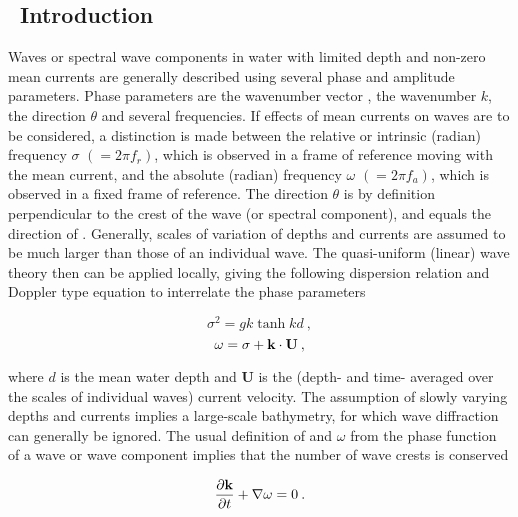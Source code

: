 \vssub
\subsection{~Introduction} \label{sec:intro}
\vssub

Waves or spectral wave components in water with limited depth and non-zero
mean currents are generally described using several phase and amplitude
parameters. Phase parameters are the wavenumber vector {\bk}, the wavenumber
$k$, the direction $\theta$ and several frequencies. If effects of mean
currents on waves are to be considered, a distinction is made between the
relative or intrinsic (radian) frequency $\sigma$ $(= 2 \pi f_r)$, which is
observed in a frame of reference moving with the mean current, and the
absolute (radian) frequency $\omega$ $(= 2 \pi f_a)$, which is observed in a
fixed frame of reference.  The direction $\theta$ is by definition
perpendicular to the crest of the wave (or spectral component), and equals the
direction of {\bk}. Generally, scales of variation of depths and currents are
assumed to be much larger than those of an individual wave. The quasi-uniform
(linear) wave theory then can be applied locally, giving the following
dispersion relation and Doppler type equation to interrelate the phase
parameters


\begin{equation}
\sigma ^2 = g k \tanh kd \: ,
\label{eq:disp}
\end{equation}
\begin{equation}
\omega = \sigma + {\mbox{\bf k}} \cdot {\bf U} \: ,
\label{eq:doppler}
\end{equation}

\noindent 
where $d$ is the mean water depth and {\bf U} is the (depth- and time-
averaged over the scales of individual waves) current velocity. The assumption
of slowly varying depths and currents implies a large-scale bathymetry, for
which wave diffraction can generally be ignored. The usual definition of {\bk}
and $\omega$ from the phase function of a wave or wave component implies that
the number of wave crests is conserved \citep[see, e.g.,][]{bk:Phi77,bk:Mei83}


\begin{equation}
\frac{\partial {\mbox{\bf k}}}{\partial t} + \nabla \omega = 0 \: .
\label{eq:wnconv}
\end{equation}

